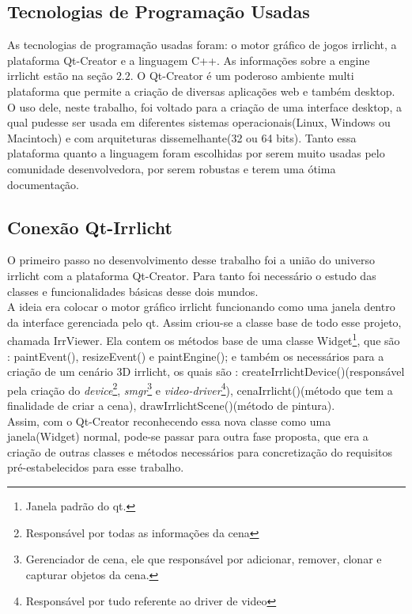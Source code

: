 \subsection{Tecnologias de Programação Usadas} 
As tecnologias de programação usadas foram: o motor gráfico de jogos irrlicht, a plataforma Qt-Creator e a linguagem C++. As informações sobre a engine irrlicht estão na seção $2.2$. O Qt-Creator é um poderoso ambiente multi plataforma que permite a criação de diversas aplicações web e também desktop. O uso dele, neste trabalho, foi voltado para a criação de uma interface desktop, a qual pudesse ser usada em diferentes sistemas operacionais(Linux, Windows ou Macintoch) e com arquiteturas dissemelhante(32 ou 64 bits). Tanto essa plataforma quanto a linguagem foram escolhidas por serem muito usadas pelo comunidade desenvolvedora, por serem robustas e terem uma ótima documentação.

\subsection{Conexão Qt-Irrlicht}
O primeiro passo no desenvolvimento desse trabalho foi a união do universo irrlicht com a plataforma Qt-Creator. Para tanto foi necessário o estudo das classes e funcionalidades básicas desse dois mundos.\\

A ideia era colocar o motor gráfico irrlicht funcionando como uma janela dentro da interface gerenciada pelo qt. Assim criou-se a classe base de todo esse projeto, chamada IrrViewer. Ela contem os métodos base de uma classe Widget\footnote{Janela padrão do qt.}, que são : paintEvent(), resizeEvent() e paintEngine(); e também os necessários para a criação de um cenário 3D irrlicht, os quais são : createIrrlichtDevice()(responsável pela criação do \textit{device}\footnote{Responsável por todas as informações da cena}, \textit{smgr}\footnote{Gerenciador de cena, ele que responsável por adicionar, remover, clonar e capturar objetos da cena.} e \textit{video-driver}\footnote{Responsável por tudo referente ao driver de video}), cenaIrrlicht()(método que tem a finalidade de criar a cena), drawIrrlichtScene()(método de pintura).\\

Assim, com o Qt-Creator reconhecendo essa nova classe como uma janela(Widget) normal, pode-se passar para outra fase proposta, que era a criação de outras classes e métodos necessários para concretização do requisitos pré-estabelecidos para esse trabalho.

